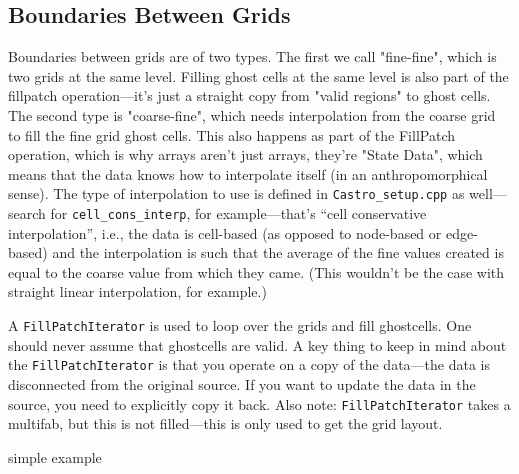 \subsection{Boundaries Between Grids}
Boundaries between grids are of two types. The first we call
"fine-fine", which is two grids at the same level.  Filling ghost
cells at the same level is also part of the fillpatch operation---it's
just a straight copy from "valid regions" to ghost cells. The second
type is "coarse-fine", which needs interpolation from the coarse grid
to fill the fine grid ghost cells.  This also happens as part of the
FillPatch operation, which is why arrays aren't just arrays, they're
"State Data", which means that the data knows how to interpolate
itself (in an anthropomorphical sense).  The type of interpolation to
use is defined in {\tt Castro\_setup.cpp} as well---search for
{\tt cell\_cons\_interp}, for example---that's ``cell conservative
interpolation'', i.e., the data is cell-based (as opposed to node-based
or edge-based) and the interpolation is such that the average of the
fine values created is equal to the coarse value from which they came.
(This wouldn't be the case with straight linear interpolation, for
example.)

A {\tt FillPatchIterator} is used to loop over the grids and fill
ghostcells.  One should never assume that ghostcells are valid.  A key
thing to keep in mind about the {\tt FillPatchIterator} is that you
operate on a copy of the data---the data is disconnected from the
original source.  If you want to update the data in the source,
you need to explicitly copy it back.  Also note: {\tt FillPatchIterator}
takes a multifab, but this is not filled---this is only used to
get the grid layout.   

{\color{red}simple example}


